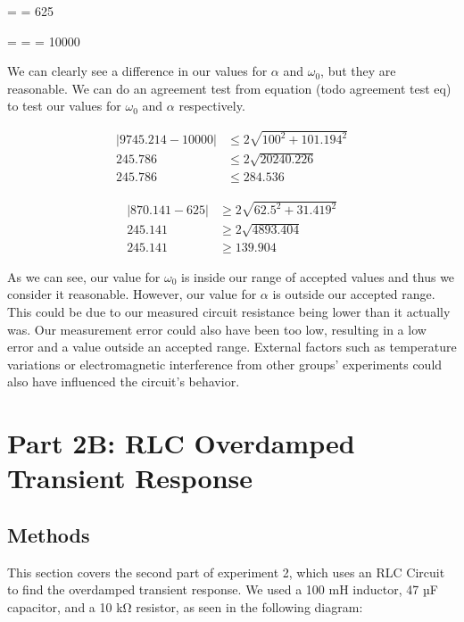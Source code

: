\documentclass[11pt]{article}
\let\oldsection\section
\renewcommand\section{\clearpage\oldsection}
\begin{document}
    \alpha =  = 625

    \omega =  =  = 10000


    We can clearly see a difference in our values for \( \alpha \) and \( \omega_0 \), but they are reasonable. We can do an agreement test from equation (todo agreement test eq) to test our values for \( \omega_0 \) and \( \alpha \) respectively.

    \begin{e}
        \begin{align*}
            |9745.214 - 10000| &\le 2 \sqrt{100^2 + 101.194^2} \\
            245.786 &\le 2 \sqrt{20240.226} \\
            245.786 &\le 284.536
        \end{align*}
    \end{e}
    \begin{e}
        \begin{align*}
            |870.141 - 625| &\ge 2 \sqrt{62.5^2 + 31.419^2} \\
            245.141 &\ge 2 \sqrt{4893.404} \\
            245.141 &\ge 139.904
        \end{align*}
    \end{e}

    As we can see, our value for \( \omega_0 \) is inside our range of accepted values and thus we consider it reasonable. However, our value for \( \alpha \) is outside our accepted range. This could be due to our measured circuit resistance being lower than it actually was. Our measurement error could also have been too low, resulting in a low error and a value outside an accepted range. External factors such as temperature variations or electromagnetic interference from other groups' experiments could also have influenced the circuit's behavior.


    \section{Part 2B: RLC Overdamped Transient Response}\label{sec:part2b_overdamped}
    \subsection{Methods}\label{subsec:part2b_methods}
    This section covers the second part of experiment 2, which uses an RLC Circuit to find the overdamped transient response. We used a 100 mH inductor, 47 µF capacitor, and a 10 kΩ resistor, as seen in the following diagram:
\end{document}

